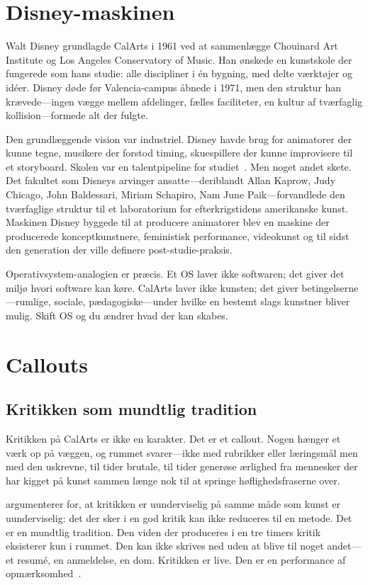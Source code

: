 \documentclass[10pt,letterpaper,twocolumn]{article}
\begin{document}
\section{Disney-maskinen}

Walt Disney grundlagde CalArts i 1961 ved at sammenlægge Chouinard Art Institute og Los Angeles Conservatory of Music. Han ønskede en kunstskole der fungerede som hans studie: alle discipliner i én bygning, med delte værktøjer og idéer. Disney døde før Valencia-campus åbnede i 1971, men den struktur han krævede---ingen vægge mellem afdelinger, fælles faciliteter, en kultur af tværfaglig kollision---formede alt der fulgte.

Den grundlæggende vision var industriel. Disney havde brug for animatorer der kunne tegne, musikere der forstod timing, skuespillere der kunne improvisere til et storyboard. Skolen var en talentpipeline for studiet~\citep{singerman1999art}. Men noget andet skete. Det fakultet som Disneys arvinger ansatte---deriblandt Allan Kaprow, Judy Chicago, John Baldessari, Miriam Schapiro, Nam June Paik---forvandlede den tværfaglige struktur til et laboratorium for efterkrigstidens amerikanske kunst. Maskinen Disney byggede til at producere animatorer blev en maskine der producerede konceptkunstnere, feministisk performance, videokunst og til sidst den generation der ville definere post-studie-praksis.

Operativsystem-analogien er præcis. Et OS laver ikke softwaren; det giver det miljø hvori software kan køre. CalArts laver ikke kunsten; det giver betingelserne---rumlige, sociale, pædagogiske---under hvilke en bestemt slags kunstner bliver mulig. Skift OS og du ændrer hvad der kan skabes.

\section{Callouts}

\subsection{Kritikken som mundtlig tradition}

Kritikken på CalArts er ikke en karakter. Det er et callout. Nogen hænger et værk op på væggen, og rummet svarer---ikke med rubrikker eller læringsmål men med den uskrevne, til tider brutale, til tider generøse ærlighed fra mennesker der har kigget på kunst sammen længe nok til at springe høflighedsfraserne over.

\citet{elkins2001why} argumenterer for, at kritikken er uunderviselig på samme måde som kunst er uunderviselig: det der sker i en god kritik kan ikke reduceres til en metode. Det er en mundtlig tradition. Den viden der produceres i en tre timers kritik eksisterer kun i rummet. Den kan ikke skrives ned uden at blive til noget andet---et resumé, en anmeldelse, en dom. Kritikken er live. Den er en performance af opmærksomhed~\citep{hooks1994teaching}.
\end{document}
